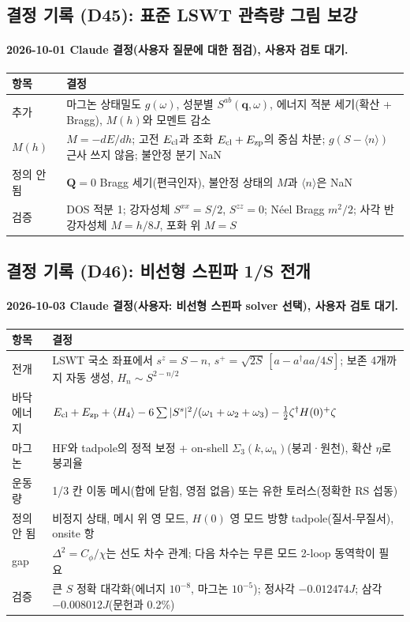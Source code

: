 \subsection{결정 기록 (D45): 표준 LSWT 관측량 그림 보강}\label{decisions-d45-standard}
\begingroup%
  \framesubtitle{2026-10-01 Claude 결정(사용자 질문에 대한 점검), 사용자 검토 대기.}
  \small\renewcommand{\arraystretch}{1.12}
  \begin{tabularx}{\textwidth}{@{}P{3.0cm}Y@{}}
    \toprule
    항목 & 결정 \\
    \midrule
    추가 & 마그논 상태밀도 $g(\omega)$, 성분별 $S^{ab}(\mathbf q,\omega)$, 에너지 적분 세기(확산 + Bragg), $M(h)$와 모멘트 감소 \\
    $M(h)$ & $M=-dE/dh$; 고전 $E_{\rm cl}$과 조화 $E_{\rm cl}+E_{\rm zp}$의 중심 차분; $g(S-\langle n\rangle)$ 근사 쓰지 않음; 불안정 분기 NaN \\
    정의 안 됨 & $\mathbf Q=0$ Bragg 세기(편극인자), 불안정 상태의 $M$과 $\langle n\rangle$은 NaN \\
    검증 & DOS 적분 1; 강자성체 $S^{xx}=S/2$, $S^{zz}=0$; Néel Bragg $m^2/2$; 사각 반강자성체 $M=h/8J$, 포화 위 $M=S$ \\
    \bottomrule
  \end{tabularx}
\endgroup


\subsection{결정 기록 (D46): 비선형 스핀파 1/S 전개}\label{decisions-d46-nlswt}
\begingroup%
  \framesubtitle{2026-10-03 Claude 결정(사용자: 비선형 스핀파 solver 선택), 사용자 검토 대기.}
  \small\renewcommand{\arraystretch}{1.12}
  \begin{tabularx}{\textwidth}{@{}P{3.0cm}Y@{}}
    \toprule
    항목 & 결정 \\
    \midrule
    전개 & LSWT 국소 좌표에서 $s^z=S-n$, $s^+=\sqrt{2S}\,[a-a^\dagger aa/4S]$; 보존 4개까지 자동 생성, $H_n\sim S^{2-n/2}$ \\
    바닥 에너지 & $E_{\rm cl}+E_{\rm zp}+\langle H_4\rangle-6\sum|S^s|^2/(\omega_1+\omega_2+\omega_3)-\tfrac12\zeta^\dagger H(0)^+\zeta$ \\
    마그논 & HF와 tadpole의 정적 보정 + on-shell $\Sigma_3(k,\omega_n)$(붕괴·원천), 확산 $\eta$로 붕괴율 \\
    운동량 & 1/3 칸 이동 메시(합에 닫힘, 영점 없음) 또는 유한 토러스(정확한 RS 섭동) \\
    정의 안 됨 & 비정지 상태, 메시 위 영 모드, $H(0)$ 영 모드 방향 tadpole(질서-무질서), onsite 항 \\
    gap & $\Delta^2=C_\phi/\chi$는 선도 차수 관계; 다음 차수는 무른 모드 2-loop 동역학이 필요 \\
    검증 & 큰 $S$ 정확 대각화(에너지 $10^{-8}$, 마그논 $10^{-5}$); 정사각 $-0.012474J$; 삼각 $-0.008012J$(문헌과 0.2\%) \\
    \bottomrule
  \end{tabularx}
\endgroup


